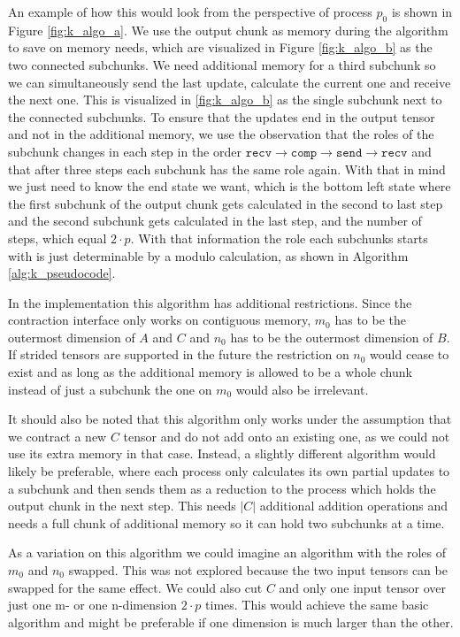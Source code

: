 An example of how this would look from the perspective of process $p_0$ is shown in Figure \ref{fig:k_algo_a}.
We use the output chunk as memory during the algorithm to save on memory needs, which are visualized in Figure \ref{fig:k_algo_b} as the two connected subchunks.
We need additional memory for a third subchunk so we can simultaneously send the last update, calculate the current one and receive the next one.
This is visualized in \ref{fig:k_algo_b} as the single subchunk next to the connected subchunks.
To ensure that the updates end in the output tensor and not in the additional memory, we use the observation that the roles of the subchunk changes in each step in the order $\texttt{recv} \rightarrow \texttt{comp} \rightarrow \texttt{send} \rightarrow \texttt{recv}$ and that after three steps each subchunk has the same role again.
With that in mind we just need to know the end state we want, which is the bottom left state where the first subchunk of the output chunk gets calculated in the second to last step and the second subchunk gets calculated in the last step, and the number of steps, which equal $2 \cdot p$.
With that information the role each subchunks starts with is just determinable by a modulo calculation, as shown in Algorithm \ref{alg:k_pseudocode}.

In the implementation this algorithm has additional restrictions.
Since the contraction interface only works on contiguous memory, $m_0$ has to be the outermost dimension of $A$ and $C$ and $n_0$ has to be the outermost dimension of $B$.
If strided tensors are supported in the future the restriction on $n_0$ would cease to exist and as long as the additional memory is allowed to be a whole chunk instead of just a subchunk the one on $m_0$ would also be irrelevant.

It should also be noted that this algorithm only works under the assumption that we contract a new $C$ tensor and do not add onto an existing one, as we could not use its extra memory in that case.
Instead, a slightly different algorithm would likely be preferable, where each process only calculates its own partial updates to a subchunk and then sends them as a reduction to the process which holds the output chunk in the next step.
This needs $|C|$ additional addition operations and needs a full chunk of additional memory so it can hold two subchunks at a time.

As a variation on this algorithm we could imagine an algorithm with the roles of $m_0$ and $n_0$ swapped.
This was not explored because the two input tensors can be swapped for the same effect.
We could also cut $C$ and only one input tensor over just one m- or one n-dimension $2 \cdot p$ times.
This would achieve the same basic algorithm and might be preferable if one dimension is much larger than the other.
